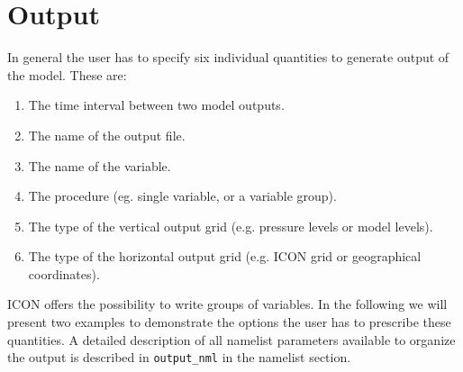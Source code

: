 \chapter{Output}



In general the user has to specify six individual quantities to generate output of the model. These are:

\begin{enumerate}
\item{The time interval between two model outputs.}
\item{The name of the output file.}
\item{The name of the variable.}
\item{The procedure (eg. single variable, or a variable group).}
\item{The type of the vertical output grid (e.g. pressure levels or model levels).}
\item{The type of the horizontal output grid (e.g. ICON grid or geographical coordinates).}
\end{enumerate}

ICON offers the possibility to write groups of variables. 
In the following we will present two examples to demonstrate the options the user has to prescribe these quantities. A detailed description of all namelist parameters available to organize the output is described  in \verb+output_nml+ in the namelist section.


